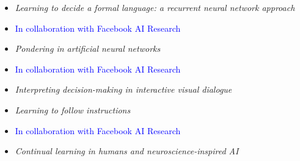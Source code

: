 {{{{{{{{
{\begin{itemize}
  \item[] \textit{Learning to decide a formal language: a recurrent neural network approach}
  \item[] \textcolor{blue}{\normalfont In collaboration with Facebook AI Research\vspace{1mm}}
\end{itemize}
}

{
{\begin{itemize}
  \item[] \textit{Pondering in artificial neural networks}
  \item[] \textcolor{blue}{\normalfont In collaboration with Facebook AI Research\vspace{1mm}}
\end{itemize}}}

{
{\begin{itemize}
  \item[] \textit{Interpreting decision-making in interactive visual dialogue}
\end{itemize}}}

{
{\begin{itemize}
  \item[] \textit{Learning to follow instructions}
  \item[] \textcolor{blue}{\normalfont In collaboration with Facebook AI Research\vspace{1mm}}
\end{itemize}}}

{
{\begin{itemize}
  \item[] \textit{Continual learning in humans and neuroscience-inspired AI}
\end{itemize}}}

}}}}}}}}

